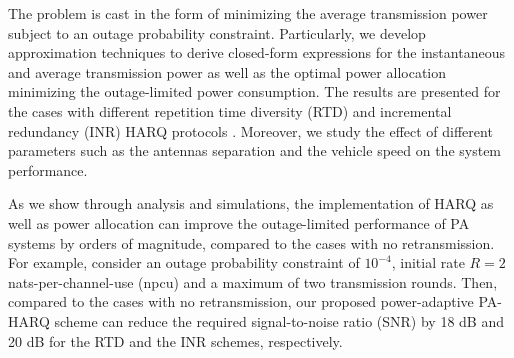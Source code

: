 The problem is cast in the form of minimizing the average transmission power subject to an outage probability constraint. Particularly, we  develop approximation techniques to derive closed-form expressions for the instantaneous and average transmission power as well as the optimal power allocation minimizing the outage-limited power consumption. The results are presented for the cases with different repetition time diversity (RTD) and incremental redundancy (INR) HARQ protocols \cite{makki2014green,chaitanya2011outage,djonin2008joint}. Moreover, we study the effect of different parameters such as the antennas separation and the vehicle speed on the system performance. 

As we show through analysis and simulations, the implementation of HARQ as well as power allocation can improve the outage-limited performance of PA systems by orders of magnitude, compared to the cases with no retransmission. For example, consider an outage probability constraint of  $10^{-4}$, initial rate $R=2$ nats-per-channel-use (npcu) and a maximum of two transmission rounds. Then, compared to the cases with no retransmission, our proposed power-adaptive PA-HARQ scheme can reduce the required signal-to-noise ratio (SNR) by  18 dB and 20 dB for the RTD and the INR schemes, respectively.












